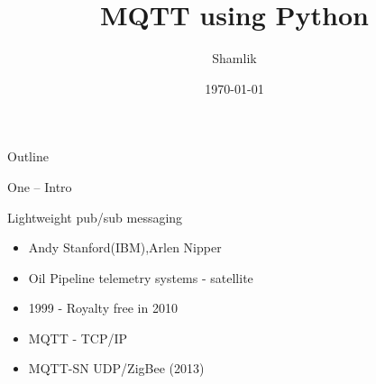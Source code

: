 \documentclass[presentation]{beamer}
\author{Shamlik}
\date{\today}
\title{MQTT using Python}
\begin{document}
\maketitle
\begin{frame}{Outline}
\tableofcontents
\end{frame}


\begin{frame}[label={sec:orgf079412}]{One -- Intro}
\begin{block}{Lightweight pub/sub messaging}
\begin{itemize}
\item Andy Stanford(IBM),Arlen Nipper
\item Oil Pipeline telemetry systems - satellite
\item 1999 - Royalty free in 2010
\item MQTT - TCP/IP
\item MQTT-SN UDP/ZigBee (2013)
\end{itemize}
\end{block}
\end{frame}
\end{document}

